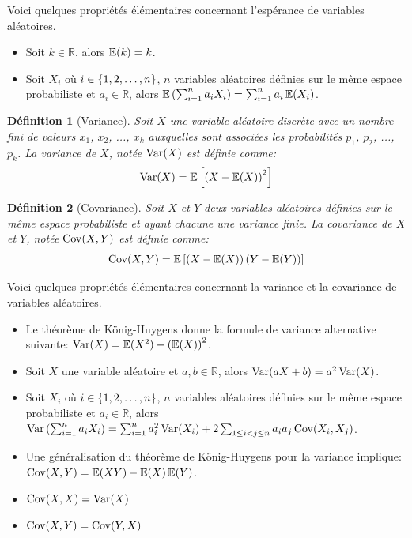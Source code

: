 \documentclass[10pt]{article}
\newtheorem{definition}{Définition}
\begin{document}
Voici quelques propriétés élémentaires concernant l'espérance de
variables aléatoires.

\begin{itemize}
\item
  Soit \(k\in\mathbb{R}\), alors \(\operatorname{\mathbb{E}}(k)=k\).
\item
  Soit \(X_i\) où \(i\in\left\{1,2,\ldots,n\right\}\), \(n\) variables aléatoires
  définies sur le même espace probabiliste et \(a_i\in\mathbb{R}\),
  alors \(\operatorname{\mathbb{E}}\left(\sum_{i=1}^na_iX_i\right)=\sum_{i=1}^n a_i\operatorname{\mathbb{E}}(X_i)\).
\end{itemize}

\begin{definition}[Variance]
Soit $X$ une variable aléatoire discrète avec un nombre fini de valeurs $x_1$, $x_2$, ..., $x_k$ auxquelles sont associées les probabilités $p_1$, $p_2$, ..., $p_k$. La variance de $X$, notée $\operatorname{Var} (X)$ est définie comme:
$$ \operatorname{Var} (X) = \operatorname{\mathbb{E}}\left[\left(X-\operatorname{\mathbb{E}}(X)\right)^2\right] $$
\end{definition}

\begin{definition}[Covariance]
Soit $X$ et $Y$ deux variables aléatoires définies sur le même espace probabiliste et ayant chacune une variance finie. La covariance de $X$ et $Y$, notée $\operatorname{Cov}(X,Y)$ est définie comme:
$$ \operatorname{Cov}(X,Y)=\operatorname{\mathbb{E}}\left[\left(X-\operatorname{\mathbb{E}}(X)\right)\left(Y-\operatorname{\mathbb{E}}(Y)\right)\right] $$
\end{definition}

Voici quelques propriétés élémentaires concernant la variance et la
covariance de variables aléatoires.

\begin{itemize}
\item
  Le théorème de König-Huygens donne la formule de variance alternative
  suivante: \(\operatorname{Var}(X)=\operatorname{\mathbb{E}}(X^2)-\left(\operatorname{\mathbb{E}}(X)\right)^2\).
\item
  Soit \(X\) une variable aléatoire et \(a,b\in\mathbb{R}\), alors
  \(\operatorname{Var}(aX+b)=a^2\operatorname{Var}(X)\).
\item
  Soit \(X_i\) où \(i\in\left\{1,2,\ldots,n\right\}\), \(n\) variables aléatoires
  définies sur le même espace probabiliste et \(a_i\in\mathbb{R}\),
  alors
  \(\operatorname{Var}\left(\sum_{i=1}^n a_iX_i\right)=\sum_{i=1}^n a_i^2\operatorname{Var}(X_i)+2\sum_{1\leq i< j\leq n} a_ia_j\operatorname{Cov}(X_i,X_j)\).
\item
  Une généralisation du théorème de König-Huygens pour la variance
  implique: \(\operatorname{Cov}(X,Y)=\operatorname{\mathbb{E}}(XY)-\operatorname{\mathbb{E}}(X)\operatorname{\mathbb{E}}(Y)\).
\item
  \(\operatorname{Cov}(X,X)=\operatorname{Var}(X)\)
\item
  \(\operatorname{Cov}(X,Y)=\operatorname{Cov}(Y,X)\)
\end{itemize}
\end{document}
